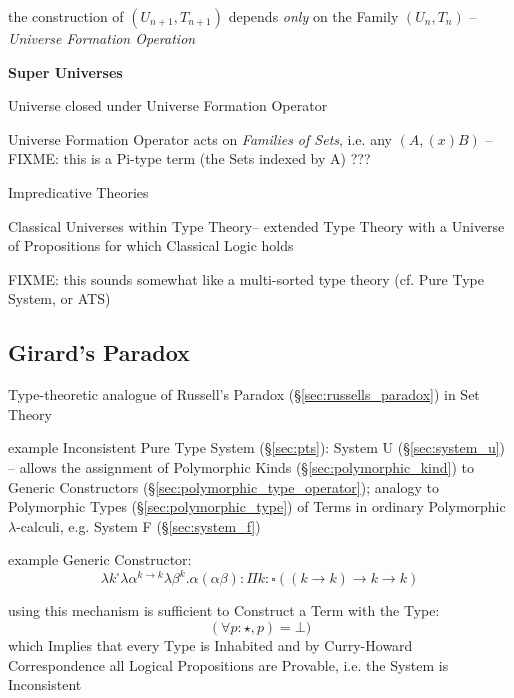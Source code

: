 the construction of $(U_{n+1},T_{n+1})$ depends \emph{only} on the
Family $(U_n,T_n)$ -- \emph{Universe Formation Operation}


\textbf{Super Universes}

Universe closed under Universe Formation Operator

Universe Formation Operator acts on \emph{Families of Sets}, i.e. any
$(A, (x)B)$ -- FIXME: this is a Pi-type term (the Sets indexed by A)
???


Impredicative Theories

Classical Universes within Type Theory-- extended Type Theory with a
Universe of Propositions for which Classical Logic holds

FIXME: this sounds somewhat like a multi-sorted type theory (cf. Pure
Type System, or ATS)



\endgroup %



\subsection{Girard's Paradox}\label{sec:girards_paradox}

Type-theoretic analogue of Russell's Paradox
(\S\ref{sec:russells_paradox}) in Set Theory

example Inconsistent Pure Type System (\S\ref{sec:pts}): System U
(\S\ref{sec:system_u}) -- allows the assignment of Polymorphic Kinds
(\S\ref{sec:polymorphic_kind}) to Generic Constructors
(\S\ref{sec:polymorphic_type_operator}); analogy to Polymorphic Types
(\S\ref{sec:polymorphic_type}) of Terms in ordinary Polymorphic
$\lambda$-calculi, e.g. System F (\S\ref{sec:system_f})

example Generic Constructor:
\[
  \lambda k^\square \lambda \alpha^{k \rightarrow k}\lambda\beta^k.
    \alpha(\alpha\beta) :
  \Pi k:\square((k \rightarrow k) \rightarrow k \rightarrow k)
\]

using this mechanism is sufficient to Construct a Term with the Type:
\[
  (\forall p:\star,p) = \bot)
\]
which Implies that every Type is Inhabited and by Curry-Howard
Correspondence all Logical Propositions are Provable, i.e. the System
is Inconsistent



